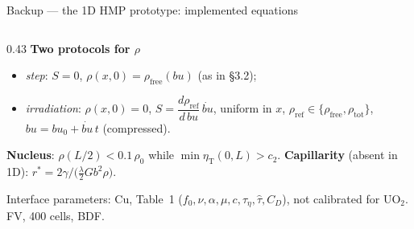 \documentclass[10pt,aspectratio=169]{beamer}
\begin{document}
\begin{frame}{Backup --- the 1D HMP prototype: implemented equations}
\begin{columns}[T]
\begin{column}{0.43\textwidth}
      \vspace{0.4em}
      \textbf{Two protocols for $\rho$}
      \begin{itemize}
        \item \emph{step}: $S=0$, $\rho(x,0)=\rho_{\text{free}}(bu)$ (as in §3.2);
        \item \emph{irradiation}: $\rho(x,0)=0$,
          $S = \dfrac{d\rho_{\text{ref}}}{d\,bu}\,\dot{bu}$, uniform in $x$,
          $\rho_{\text{ref}}\in\{\rho_{\text{free}},\rho_{\text{tot}}\}$,
          $bu = bu_0 + \dot{bu}\,t$ (compressed).
      \end{itemize}

      \vspace{0.2em}
      \textbf{Nucleus}: $\rho(L/2) < 0.1\,\rho_0$ while $\min\eta_{\text{T}}(0,L) > c_2$.
      \textbf{Capillarity} (absent in 1D): $r^* = 2\gamma\big/\big(\tfrac{\lambda}{2}Gb^2\rho\big)$.

      \vspace{0.2em}
      Interface parameters: Cu, Table~1 ($f_0,\nu,\alpha,\mu,c,\tau_\eta,\hat\tau,C_D$), not calibrated for UO$_2$.
      FV, 400 cells, BDF.
    \end{column}
  \end{columns}
\end{frame}
\end{document}
